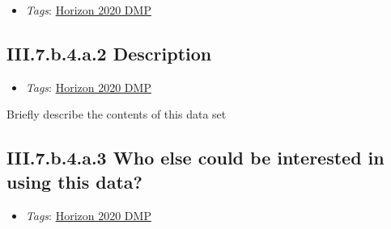 \documentclass[a4paper,12pt]{report}
\begin{document}
\begin{itemize}
  \item \textit{Tags}: \ul{Horizon 2020 DMP}
  \end{itemize}





\subsection*{\protect\textcolor{colorSecId}{III.7.b.4.a.2} Description}

\label{b1df3c74-0b1f-4574-81c4-4cc2d780c1af.f038bd46-ee4e-4f53-b7ea-482381c2c855.4fd89b13-f33c-4858-8b25-ab6da271efc6.b642c31d-a512-4ca7-8743-a2e0254006fa.539c5087-3111-4e57-92e3-8a00ec1c1b82.934f6592-a032-4ada-91b2-4448d740d157}


\begin{itemize}
  \item \textit{Tags}: \ul{Horizon 2020 DMP}
  \end{itemize}


\noindent
\begin{markdown}
Briefly describe the contents of this data set
\end{markdown}




\subsection*{\protect\textcolor{colorSecId}{III.7.b.4.a.3} Who else could be interested in using this data?}

\label{b1df3c74-0b1f-4574-81c4-4cc2d780c1af.f038bd46-ee4e-4f53-b7ea-482381c2c855.4fd89b13-f33c-4858-8b25-ab6da271efc6.b642c31d-a512-4ca7-8743-a2e0254006fa.539c5087-3111-4e57-92e3-8a00ec1c1b82.c520b63c-cc35-4789-9d98-cc87b59ebcf1}


\begin{itemize}
  \item \textit{Tags}: \ul{Horizon 2020 DMP}
  \end{itemize}
\end{document}
